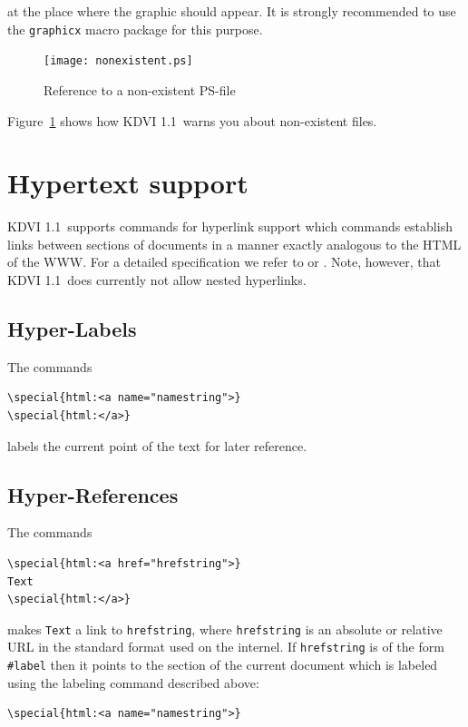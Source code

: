\documentclass{article}
\newcommand{\KDVI}{{\sf KDVI 1.1}}
\begin{document}
at the place where the graphic should appear. It is strongly
recommended to use the {\tt graphicx} macro package for this purpose.
\begin{figure}
  \begin{center}
    \texttt{[image: nonexistent.ps]}
  \end{center}
\caption{Reference to a non-existent PS-file\label{nonex-special}}
\end{figure}
Figure~\ref{nonex-special} shows how \KDVI\ warns you about
non-existent files.


\section{Hypertext support}

\KDVI\ supports commands for hyperlink support which commands
establish links between sections of documents in a manner exactly
analogous to the HTML of the WWW. For a detailed specification we
refer to \cite{HFAQ99} or \cite{Rah98}. Note, however, that \KDVI\ 
does currently not allow nested hyperlinks.

\subsection{Hyper-Labels}

The commands
\begin{verbatim}
\special{html:<a name="namestring">}
\special{html:</a>}
\end{verbatim}
labels the current point of the text for later reference.

\subsection{Hyper-References}

The commands 
\begin{verbatim}
\special{html:<a href="hrefstring">}
Text
\special{html:</a>}
\end{verbatim}
makes {\tt Text} a link to {\tt hrefstring}, where {\tt hrefstring} is
an absolute or relative URL in the standard format used on the
internel. If {\tt hrefstring} is of the form {\tt \#label} then it
points to the section of the current document which is labeled using
the labeling command described above:
\begin{verbatim}
\special{html:<a name="namestring">}
\end{verbatim}
\end{document}

